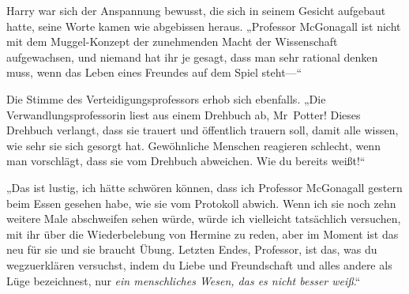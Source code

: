 Harry war sich der Anspannung bewusst, die sich in seinem Gesicht aufgebaut hatte, seine Worte kamen wie abgebissen heraus. „Professor McGonagall ist nicht mit dem Muggel-Konzept der zunehmenden Macht der Wissenschaft aufgewachsen, und niemand hat ihr je gesagt, dass man sehr rational denken muss, wenn das Leben eines Freundes auf dem Spiel steht—“

Die Stimme des Verteidigungsprofessors erhob sich ebenfalls. „Die Verwandlungsprofessorin liest aus einem Drehbuch ab, Mr~Potter! Dieses Drehbuch verlangt, dass sie trauert und öffentlich trauern soll, damit alle wissen, wie sehr sie sich gesorgt hat. Gewöhnliche Menschen reagieren schlecht, wenn man vorschlägt, dass sie vom Drehbuch abweichen. Wie du bereits weißt!“

„Das ist lustig, ich hätte schwören können, dass ich Professor McGonagall gestern beim Essen gesehen habe, wie sie vom Protokoll abwich. Wenn ich sie noch zehn weitere Male abschweifen sehen würde, würde ich vielleicht tatsächlich versuchen, mit ihr über die Wiederbelebung von Hermine zu reden, aber im Moment ist das neu für sie und sie braucht Übung. Letzten Endes, Professor, ist das, was du wegzuerklären versuchst, indem du Liebe und Freundschaft und alles andere als Lüge bezeichnest, nur \emph{ein menschliches Wesen, das es nicht besser weiß}.“

